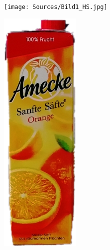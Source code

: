 \documentclass[a4paper,12pt,oneside]{article}
\begin{document}
\begin{figure}[htb]
\begin{minipage}[c]{0.2\textwidth}
\texttt{[image: Sources/Bild1\_HS.jpg]}
\end{minipage}
\hfill
\begin{minipage}[c]{0.08\textwidth}
\includegraphics[width=\textwidth]{Sources/Bild1_HS.png}

\end{minipage}
\end{figure}
\end{document}
